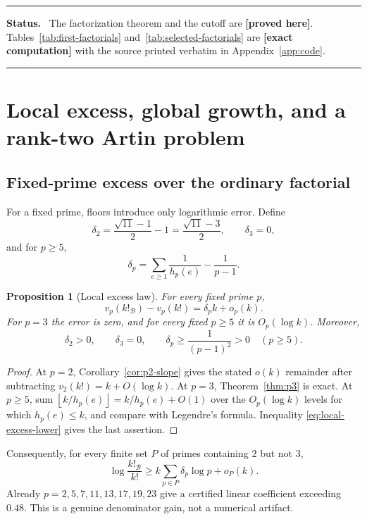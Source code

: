 \documentclass[11pt,oneside]{article}
\newtheorem{proposition}[theorem]{Proposition}
\theoremstyle{definition}
\theoremstyle{remark}
\newcommand{\B}{\mathcal B}
\newcommand{\floor}[1]{\left\lfloor #1\right\rfloor}
\newcommand{\statusproved}{\textcolor{newgreen}{\textbf{[proved here]}}}
\newcommand{\statuscomputed}{\textcolor{compviolet}{\textbf{[exact computation]}}}
\newenvironment{statusbox}
{\begin{center}\begin{minipage}{0.94\textwidth}\raggedright\hrule
\vspace{0.42em}\textbf{Status.}\ }
{\par\vspace{0.32em}\hrule\end{minipage}\end{center}}
\begin{document}
\begin{statusbox}
The factorization theorem and the cutoff are \statusproved.  Tables~\ref{tab:first-factorials}
and~\ref{tab:selected-factorials} are \statuscomputed{} with the source printed verbatim in
Appendix~\ref{app:code}.
\end{statusbox}

\section{Local excess, global growth, and a rank-two Artin problem}
\label{sec:growth}

\subsection{Fixed-prime excess over the ordinary factorial}

For a fixed prime, floors introduce only logarithmic error.  Define
\[
 \delta_2=\frac{\sqrt{11}-1}2-1=\frac{\sqrt{11}-3}2,
 \qquad
 \delta_3=0,
\]
and for \(p\ge5\),
\begin{equation}
 \delta_p=\sum_{e\ge1}\frac1{h_p(e)}-\frac1{p-1}.
 \label{eq:delta-p}
\end{equation}

\begin{proposition}[Local excess law]
\label{prop:local-excess}
For every fixed prime \(p\),
\begin{equation}
 v_p(k!_{\B})-v_p(k!)=\delta_p k+o_p(k).
 \label{eq:local-excess-asymptotic}
\end{equation}
For \(p=3\) the error is zero, and for every fixed \(p\ge5\) it is
\(O_p(\log k)\).  Moreover,
\[
 \delta_2>0,\qquad \delta_3=0,\qquad \delta_p\ge\frac1{(p-1)^2}>0
 \quad(p\ge5).
\]
\end{proposition}

\begin{proof}
At \(p=2\), Corollary~\ref{cor:p2-slope} gives the stated \(o(k)\) remainder after
subtracting \(v_2(k!)=k+O(\log k)\).  At \(p=3\),
Theorem~\ref{thm:p3} is exact.  At \(p\ge5\), sum
\(\floor{k/h_p(e)}=k/h_p(e)+O(1)\) over the \(O_p(\log k)\) levels for which
\(h_p(e)\le k\), and compare with Legendre's formula.  Inequality
\eqref{eq:local-excess-lower} gives the last assertion.
\end{proof}

Consequently, for every finite set \(P\) of primes containing \(2\) but not \(3\),
\begin{equation}
 \log\frac{k!_{\B}}{k!}
 \ge
 k\sum_{p\in P}\delta_p\log p+o_P(k).
 \label{eq:finite-prime-lower}
\end{equation}
Already \(p=2,5,7,11,13,17,19,23\) give a certified linear coefficient exceeding
\(0.48\).  This is a genuine denominator gain, not a numerical artifact.
\end{document}
